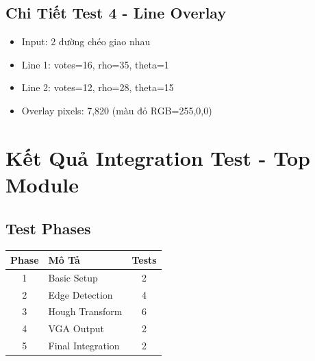 \documentclass[12pt,a4paper]{article}
\begin{document}
\subsection{Chi Tiết Test 4 - Line Overlay}
\begin{itemize}
    \item Input: 2 đường chéo giao nhau
    \item Line 1: votes=16, rho=35, theta=1
    \item Line 2: votes=12, rho=28, theta=15
    \item Overlay pixels: 7,820 (màu đỏ RGB=255,0,0)
\end{itemize}

\section{Kết Quả Integration Test - Top Module}

\subsection{Test Phases}
\begin{table}[h]
\centering
\begin{tabular}{|c|l|c|}
\hline
\textbf{Phase} & \textbf{Mô Tả} & \textbf{Tests} \\
\hline
1 & Basic Setup & 2 \\
2 & Edge Detection & 4 \\
3 & Hough Transform & 6 \\
4 & VGA Output & 2 \\
5 & Final Integration & 2 \\
\hline
\end{tabular}
\end{table}
\end{document}
